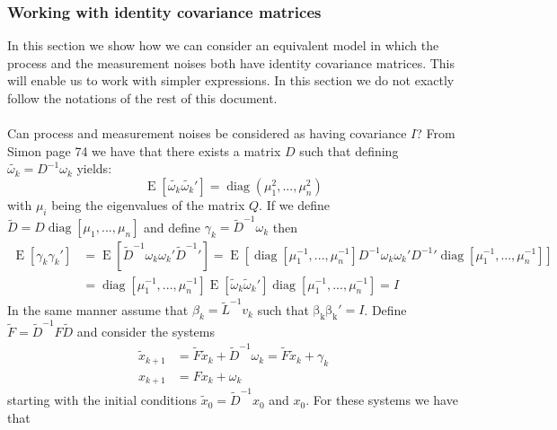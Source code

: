 \documentclass[oneside,12pt]{article}
\begin{document}
\subsubsection{Working with identity covariance matrices}\label{sec:identityCov}
%
In this section we show how we can consider an equivalent model in which the process and the measurement noises both have identity covariance matrices. This will enable us to work with simpler expressions. In this section we do not exactly follow the notations of the rest of this document.\\\\
%
Can process and measurement noises be considered as having covariance $I$? From Simon page 74 we have that there exists a matrix $D$ such that defining $\tilde{\omega_k} = D^{-1}\omega_k$ yields:
%
\begin{equation}
    \operatorname{E}[\tilde{\omega_k} \tilde{\omega_k}'] = \operatorname{diag}(\mu_1^2,...,\mu_n^2)
\end{equation}
%
with $\mu_i$ being the eigenvalues of the matrix $Q$. If we define $\tilde{D} = D \operatorname{diag}[\mu_1,...,\mu_n]$ and define $\gamma_k = \tilde{D}^{-1}\omega_k$ then
%
\begin{equation}
    \begin{split}
        \operatorname{E}[\gamma_k \gamma_k'] 
        &= \operatorname{E}[\tilde{D}^{-1}\omega_k \omega_k'\tilde{D}^{-1}']
        = \operatorname{E}[\operatorname{diag}[\mu_1^{-1},...,\mu_n^{-1}] D^{-1} \omega_k \omega_k'D^{-1}'\operatorname{diag}[\mu_1^{-1},...,\mu_n^{-1}]]\\
        &= \operatorname{diag}[\mu_1^{-1},...,\mu_n^{-1}] \operatorname{E}[\tilde{\omega}_k \tilde{\omega}_k'] \operatorname{diag}[\mu_1^{-1},...,\mu_n^{-1}] = I
    \end{split}
\end{equation}
%
In the same manner assume that $\beta_k=\tilde{L}^{-1}v_k$ such that $\operatorname{\beta_k \beta_k'} = I$. Define $\tilde{F} = \tilde{D}^{-1}F\tilde{D}$ and consider the systems
%
\begin{equation}
    \begin{split}
        \tilde{x}_{k+1} &= \tilde{F}\tilde{x}_k + \tilde{D}^{-1}\omega_k = \tilde{F}\tilde{x}_k + \gamma_k\\
        {x}_{k+1} &= {F}{x}_k + \omega_k
    \end{split}
\end{equation}
%
starting with the initial conditions $\tilde{x}_0 = \tilde{D}^{-1} x_0$ and $x_0$. For these systems we have that 
\end{document}
